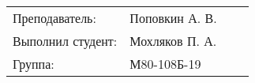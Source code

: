 \documentclass[oneside,a4paper,12pt]{extreport}
\begin{document}
\begin{center}
    \vspace{1cm}

    \begin{flushright}
      \begin{tabular}{lp{4cm}lp{4cm}}
        Преподаватель: & Поповкин А. В.\\
        Выполнил студент: & Мохляков П. А.\\
        Группа: & М80-108Б-19\\
      \end{tabular}
    \end{flushright}


\end{center}
\end{document}
